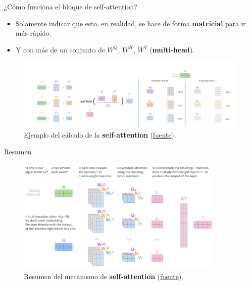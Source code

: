 \begin{frame}{¿Cómo funciona el bloque de self-attention?}

\begin{itemize}
    \item Solamente indicar que esto, en realidad, se hace de forma \textbf{matricial} para ir más rápido.
    \item Y con más de un conjunto de $W^Q$, $W^K$, $W^V$ (\textbf{multi-head}).
\end{itemize}

\begin{figure}
    \centering
    \includegraphics[width=\textwidth]{Slides/figures/02_Metodos_Generativos/trans-att6.png}
    \caption{Ejemplo del cálculo de la \textbf{self-attention} (\href{http://jalammar.github.io/illustrated-transformer/}{fuente}).}
\end{figure}
\end{frame}


\begin{frame}{Resumen}

\begin{figure}
    \centering
    \includegraphics[width=0.9\textwidth]{Slides/figures/02_Metodos_Generativos/trans-att-resumen.png}
    \caption{Resumen del mecanismo de \textbf{self-attention} (\href{http://jalammar.github.io/illustrated-transformer/}{fuente}).}
\end{figure}
\end{frame}


